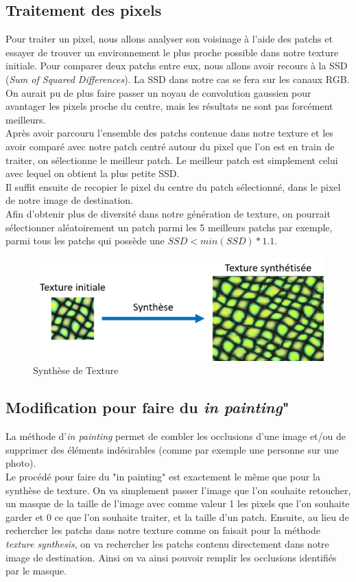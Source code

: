 \subsection{Traitement des pixels}
Pour traiter un pixel, nous allons analyser son voisinage à l'aide des patchs et essayer de trouver un environnement le plus proche possible dans notre texture initiale. Pour comparer deux patchs entre eux, nous allons avoir recours à la SSD (\textit{Sum of Squared Differences}). La SSD dans notre cas se fera sur les canaux RGB. On aurait pu de plus faire passer un noyau de convolution gaussien pour avantager les pixels proche du centre, mais les résultats ne sont pas forcément meilleurs.
\\
Après avoir parcouru l'ensemble des patchs contenue dans notre texture et les avoir comparé avec notre patch centré autour du pixel que l'on est en train de traiter, on 
sélectionne le meilleur patch. Le meilleur patch est simplement celui avec lequel on obtient la plus petite SSD. 
\\
Il suffit ensuite de recopier le pixel du centre du patch sélectionné, dans le pixel de notre image de destination.
\\
Afin d'obtenir plus de diversité dans notre génération de texture, on pourrait sélectionner aléatoirement un patch parmi les 5 meilleurs patchs par exemple, parmi tous les patchs qui possède une $SSD < min(SSD) * 1.1$.

\begin{figure}[!h]
\centering
\includegraphics[scale=0.6]{synthese_de_texture.png}
\caption{Synthèse de Texture}
\end{figure}

\subsection{Modification pour faire du \textit{in painting}"}
La méthode d'\textit{in painting} permet de combler les occlusions d'une image et/ou de supprimer des éléments indésirables (comme par exemple une personne sur une photo).
\\
Le procédé pour faire du "in painting" est exactement le même que pour la synthèse de texture. On va simplement passer l'image que l'on souhaite retoucher, un masque de la taille de l'image avec comme valeur 1 les pixels que l'on souhaite garder et 0 ce que l'on souhaite traiter, et la taille d'un patch. Ensuite, au lieu de rechercher les patchs dans notre texture comme on faisait pour la méthode \textit{texture synthesis}, on va rechercher les patchs contenu directement dans notre image de destination. Ainsi on va ainsi pouvoir remplir les occlusions identifiés par le masque.

